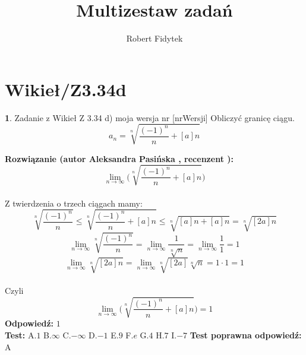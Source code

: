 \documentclass[12pt, a4paper]{article}
\title{Multizestaw zadań}
\author{Robert Fidytek}
\date{}
\theoremstyle{definition} %
\newtheorem{zad}{}
\newcommand{\kategoria}[1]{\section{#1}} %
\newcommand{\zadStart}[1]{\begin{zad}#1\newline} %
\newcommand{\zadStop}{\end{zad}}   %
\newcommand{\rozwStart}[2]{\noindent \textbf{Rozwiązanie (autor #1 , recenzent #2): }\newline} %
\newcommand{\rozwStop}{\newline}                                            %
\newcommand{\odpStart}{\noindent \textbf{Odpowiedź:}\newline}    %
\newcommand{\odpStop}{\newline}                                             %
\newcommand{\testStart}{\noindent \textbf{Test:}\newline} %
\newcommand{\testStop}{\newline} %
\newcommand{\kluczStart}{\noindent \textbf{Test poprawna odpowiedź:}\newline} %
\newcommand{\kluczStop}{\newline} %
\begin{document}
\maketitle


\kategoria{Wikieł/Z3.34d}
\zadStart{Zadanie z Wikieł Z 3.34 d) moja wersja nr [nrWersji]}
Obliczyć granicę ciągu. $$a_n=\sqrt[n]{\frac{(-1)^n}{n}+[a]n}$$
\zadStop
\rozwStart{Aleksandra Pasińska}{}
$$\lim_{n\rightarrow \infty}\biggl(\sqrt[n]{\frac{(-1)^n}{n}+[a]n}\biggr)$$\\
Z twierdzenia o trzech ciągach mamy:
$$\sqrt[n]{\frac{(-1)^n}{n}}\leqslant \sqrt[n]{\frac{(-1)^n}{n}+[a]n} \leqslant \sqrt[n]{[a]n+[a]n}= \sqrt[n]{[2a]n}$$
$$\lim_{n\rightarrow \infty}\sqrt[n]{\frac{(-1)^n}{n}}=\lim_{n\rightarrow \infty}\frac{1}{\sqrt[n]{n}}=\lim_{n\rightarrow \infty}\frac{1}{1}=1$$
$$\lim_{n\rightarrow \infty}\sqrt[n]{[2a]n}=\lim_{n\rightarrow \infty}\sqrt[n]{[2a]}\sqrt[n]{n}=1\cdot 1=1$$\\
Czyli $$\lim_{n\rightarrow \infty}\biggl(\sqrt[n]{\frac{(-1)^n}{n}+[a]n}\biggr)=1$$
\rozwStop
\odpStart
$1$\\
\odpStop
\testStart
A.$1$
B.$\infty$
C.$-\infty$
D.$-1$
E.$9$
F.$e$
G.$4$
H.$7$
I.$-7$
\testStop
\kluczStart
A
\kluczStop
\end{document}
